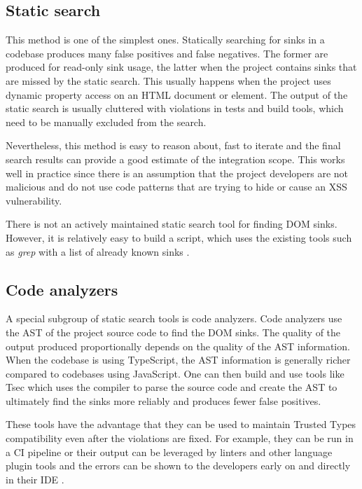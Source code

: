 \subsection{Static search}

This method is one of the simplest ones. Statically searching for sinks in a codebase produces many
false positives and false negatives. The former are produced for read-only sink usage, the latter
when the project contains sinks that are missed by the static search. This usually happens when the
project uses dynamic property access on an HTML document or element. The output of the static search
is usually cluttered with violations in tests and build tools, which need to be manually excluded
from the search.

Nevertheless, this method is easy to reason about, fast to iterate and the final search results can
provide a good estimate of the integration scope. This works well in practice since there is an
assumption that the project developers are not malicious and do not use code patterns that are
trying to hide or cause an XSS vulnerability.

There is not an actively maintained static search tool for finding DOM sinks. However, it is
relatively easy to build a script, which uses the existing tools such as \emph{grep} with a list
of already known sinks \cite{xss_sink_finder}.

\subsection{Code analyzers}

A special subgroup of static search tools is code analyzers. Code analyzers use the AST of the
project source code to find the DOM sinks. The quality of the output produced proportionally depends
on the quality of the AST information. When the codebase is using TypeScript, the AST information is
generally richer compared to codebases using JavaScript. One can then build and use tools like Tsec
\cite{tsec_github} which uses the compiler to parse the source code and create the AST to ultimately
find the sinks more reliably and produces fewer false positives.

These tools have the advantage that they can be used to maintain Trusted Types compatibility even
after the violations are fixed. For example, they can be run in a CI pipeline or their output can be
leveraged by linters and other language plugin tools and the errors can be shown to the developers
early on and directly in their IDE \cite{tsec_lsp}.

